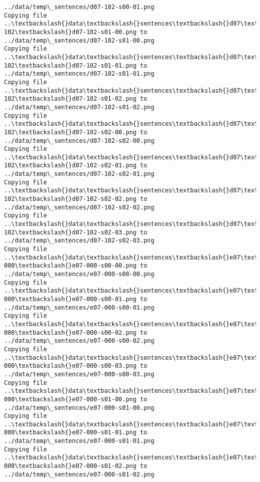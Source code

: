 \documentclass[11pt]{article}
\begin{document}
\begin{Verbatim}[commandchars=\\\{\}]
../data/temp\_sentences/d07-102-s00-01.png
Copying file ..\textbackslash{}data\textbackslash{}sentences\textbackslash{}d07\textbackslash{}d07-102\textbackslash{}d07-102-s01-00.png to
../data/temp\_sentences/d07-102-s01-00.png
Copying file ..\textbackslash{}data\textbackslash{}sentences\textbackslash{}d07\textbackslash{}d07-102\textbackslash{}d07-102-s01-01.png to
../data/temp\_sentences/d07-102-s01-01.png
Copying file ..\textbackslash{}data\textbackslash{}sentences\textbackslash{}d07\textbackslash{}d07-102\textbackslash{}d07-102-s01-02.png to
../data/temp\_sentences/d07-102-s01-02.png
Copying file ..\textbackslash{}data\textbackslash{}sentences\textbackslash{}d07\textbackslash{}d07-102\textbackslash{}d07-102-s02-00.png to
../data/temp\_sentences/d07-102-s02-00.png
Copying file ..\textbackslash{}data\textbackslash{}sentences\textbackslash{}d07\textbackslash{}d07-102\textbackslash{}d07-102-s02-01.png to
../data/temp\_sentences/d07-102-s02-01.png
Copying file ..\textbackslash{}data\textbackslash{}sentences\textbackslash{}d07\textbackslash{}d07-102\textbackslash{}d07-102-s02-02.png to
../data/temp\_sentences/d07-102-s02-02.png
Copying file ..\textbackslash{}data\textbackslash{}sentences\textbackslash{}d07\textbackslash{}d07-102\textbackslash{}d07-102-s02-03.png to
../data/temp\_sentences/d07-102-s02-03.png
Copying file ..\textbackslash{}data\textbackslash{}sentences\textbackslash{}e07\textbackslash{}e07-000\textbackslash{}e07-000-s00-00.png to
../data/temp\_sentences/e07-000-s00-00.png
Copying file ..\textbackslash{}data\textbackslash{}sentences\textbackslash{}e07\textbackslash{}e07-000\textbackslash{}e07-000-s00-01.png to
../data/temp\_sentences/e07-000-s00-01.png
Copying file ..\textbackslash{}data\textbackslash{}sentences\textbackslash{}e07\textbackslash{}e07-000\textbackslash{}e07-000-s00-02.png to
../data/temp\_sentences/e07-000-s00-02.png
Copying file ..\textbackslash{}data\textbackslash{}sentences\textbackslash{}e07\textbackslash{}e07-000\textbackslash{}e07-000-s00-03.png to
../data/temp\_sentences/e07-000-s00-03.png
Copying file ..\textbackslash{}data\textbackslash{}sentences\textbackslash{}e07\textbackslash{}e07-000\textbackslash{}e07-000-s01-00.png to
../data/temp\_sentences/e07-000-s01-00.png
Copying file ..\textbackslash{}data\textbackslash{}sentences\textbackslash{}e07\textbackslash{}e07-000\textbackslash{}e07-000-s01-01.png to
../data/temp\_sentences/e07-000-s01-01.png
Copying file ..\textbackslash{}data\textbackslash{}sentences\textbackslash{}e07\textbackslash{}e07-000\textbackslash{}e07-000-s01-02.png to
../data/temp\_sentences/e07-000-s01-02.png

\end{Verbatim}
\end{document}
